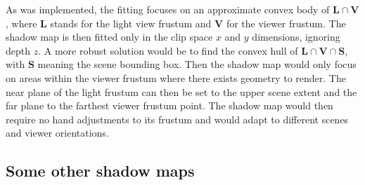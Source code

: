 As was implemented, the fitting focuses on an approximate convex body of \(\mathbf{L}\cap \mathbf{V}\), where \(\mathbf{L}\) stands for the light view frustum and \(\mathbf{V}\) for the viewer frustum. The shadow map is then fitted only in the clip space \(x\) and \(y\) dimensions, ignoring depth \(z\). A more robust solution would be to find the convex hull of \(\mathbf{L}\cap \mathbf{V}\cap \mathbf{S}\), with \(\mathbf{S}\) meaning the scene bounding box. Then the shadow map would only focus on areas within the viewer frustum where there exists geometry to render. The near plane of the light frustum can then be set to the upper scene extent and the far plane to the farthest viewer frustum point. The shadow map would then require no hand adjustments to its frustum and would adapt to different scenes and viewer orientations.

\subsection{Some other shadow maps}








